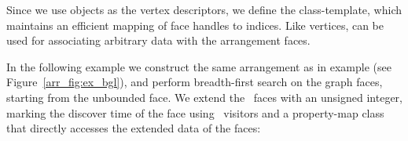 Since we use  objects as the vertex descriptors, we define
the  class-template, which maintains an
efficient mapping of face handles to indices.
Like vertices,  can be
used for associating arbitrary data with the arrangement faces.

In the following example we construct the same arrangement as in
example  (see Figure~\ref{arr_fig:ex_bgl}),
and perform breadth-first search on the graph faces, starting from the
unbounded face. We extend the \dcel\ faces
with an unsigned integer, marking the discover time of the face
using \boost\ visitors and a property-map class that directly accesses
the extended data of the faces:


